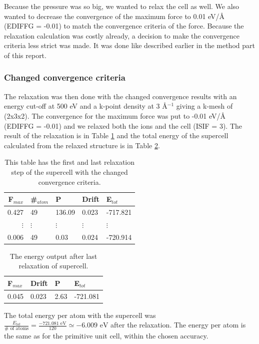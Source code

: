 Because the pressure was so big, we wanted to relax the cell as well. We also wanted to decrease the convergence of the maximum force to 0.01 eV/Å (EDIFFG = -0.01) to match the convergence criteria of the force. Because the relaxation calculation was costly already, a decision to make the convergence criteria less strict was made. It was done like described earlier in the method part of this report. 



\subsubsection{Changed convergence criteria}

The relaxation was then done with the changed convergence results with an energy cut-off at 500 eV and a k-point density at 3 Å$^{-1}$ giving a k-mesh of (2x3x2). The convergence for the maximum force was put to -0.01 eV/Å (EDIFFG = -0.01) and we relaxed both the ions and the cell (ISIF = 3). The result of the relaxation is in Table \ref{tab:ionstep_convergence_new} and the total energy of the supercell calculated from the relaxed structure is in Table \ref{tab:energy_supercell_after_relax_new}.

\begin{table}[H]\caption{This table has the first and last relaxation step of the supercell with the changed convergence criteria.}\label{tab:ionstep_convergence_new}
\begin{tabular}{rllll}
F$_{max}$ &\#$_{atom}$&	P&	Drift&	E$_{tot}$\\ \hline
0.427&	49&	136.09&	0.023&	-717.821\\
$\vdots$&$\vdots$&$\vdots$&$\vdots$&$\vdots$\\
0.006&	49&	0.03&	0.024&	-720.914\\
\end{tabular}
\end{table}

\begin{table}[H]\caption{The energy output after last relaxation of supercell.}\label{tab:energy_supercell_after_relax_new}
\begin{tabular}{llll}
F$_{max}$ & Drift&	P&	E$_{tot}$\\ \hline
0.045&	0.023&	2.63	&-721.081\\
\end{tabular}
\end{table}

The total energy per atom with the supercell was $\frac{E_{tot}}{\# \text{ of atoms}} = \frac{-721.081 \text{ eV}}{120} \simeq -6.009 \text{ eV}$ after the relaxation. The energy per atom is the same as for the primitive unit cell, within the chosen accuracy. 

